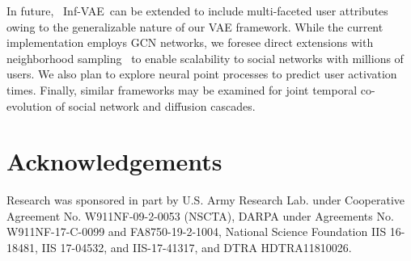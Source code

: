 \documentclass[sigconf]{acmart}
\newcommand{\name}{Inf-VAE}
\begin{document}
In future, ~\name~can be extended to include multi-faceted user attributes owing to the generalizable nature of our VAE framework. While the current implementation employs GCN networks, we foresee direct extensions with neighborhood sampling~\cite{graphsage} to enable scalability to social networks with millions of users. 
We also plan to explore neural point processes to predict user activation times. 
Finally, similar frameworks may be examined for joint temporal co-evolution of social network and diffusion cascades.

\section{Acknowledgements}
Research was sponsored in part by U.S. Army Research Lab. under Cooperative Agreement No. W911NF-09-2-0053 (NSCTA), DARPA under Agreements No. W911NF-17-C-0099 and FA8750-19-2-1004, National Science Foundation IIS 16-18481, IIS 17-04532, and IIS-17-41317, and DTRA HDTRA11810026.



\end{document}
